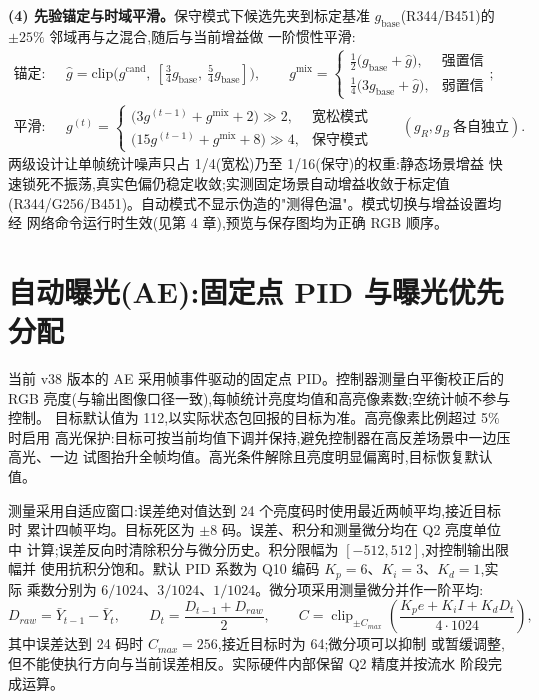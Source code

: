 \textbf{(4) 先验锚定与时域平滑。}保守模式下候选先夹到标定基准
$g_{\mathrm{base}}$(R344/B451)的 $\pm25\%$ 邻域再与之混合,随后与当前增益做
一阶惯性平滑:
\begin{align*}
\text{锚定:}\quad & \hat g=\mathrm{clip}\bigl(g^{\mathrm{cand}},\
[\tfrac34 g_{\mathrm{base}},\ \tfrac54 g_{\mathrm{base}}]\bigr),\qquad
g^{\mathrm{mix}}=\begin{cases}\tfrac12\bigl(g_{\mathrm{base}}+\hat g\bigr), & \text{强置信}\\[2pt]
\tfrac14\bigl(3g_{\mathrm{base}}+\hat g\bigr), & \text{弱置信}\end{cases};\\[4pt]
\text{平滑:}\quad & g^{(t)}=\begin{cases}
\bigl(3g^{(t-1)}+g^{\mathrm{mix}}+2\bigr)\gg 2, & \text{宽松模式}\\[2pt]
\bigl(15g^{(t-1)}+g^{\mathrm{mix}}+8\bigr)\gg 4, & \text{保守模式}\end{cases}
\qquad(g_R,g_B\ \text{各自独立}) .
\end{align*}
两级设计让单帧统计噪声只占 1/4(宽松)乃至 1/16(保守)的权重:静态场景增益
快速锁死不振荡,真实色偏仍稳定收敛;实测固定场景自动增益收敛于标定值
(R344/G256/B451)。自动模式不显示伪造的"测得色温"。模式切换与增益设置均经
网络命令运行时生效(见第 4 章),预览与保存图均为正确 RGB 顺序。

\section{自动曝光(AE):固定点 PID 与曝光优先分配}

当前 v38 版本的 AE 采用帧事件驱动的固定点 PID。控制器测量白平衡校正后的 RGB
亮度(与输出图像口径一致),每帧统计亮度均值和高亮像素数;空统计帧不参与控制。
目标默认值为 112,以实际状态包回报的目标为准。高亮像素比例超过 5\% 时启用
高光保护:目标可按当前均值下调并保持,避免控制器在高反差场景中一边压高光、一边
试图抬升全帧均值。高光条件解除且亮度明显偏离时,目标恢复默认值。

测量采用自适应窗口:误差绝对值达到 24 个亮度码时使用最近两帧平均,接近目标时
累计四帧平均。目标死区为 $\pm8$ 码。误差、积分和测量微分均在 Q2 亮度单位中
计算;误差反向时清除积分与微分历史。积分限幅为 $[-512,512]$,对控制输出限幅并
使用抗积分饱和。默认 PID 系数为 Q10 编码 $K_p=6$、$K_i=3$、$K_d=1$,实际
乘数分别为 $6/1024$、$3/1024$、$1/1024$。微分项采用测量微分并作一阶平均:
\begin{equation*}
D_{raw}=\bar Y_{t-1}-\bar Y_t,\qquad
D_t=\frac{D_{t-1}+D_{raw}}{2},\qquad
C=\operatorname{clip}_{\pm C_{max}}\left(\frac{K_pe+K_iI+K_dD_t}{4\cdot1024}\right),
\end{equation*}
其中误差达到 24 码时 $C_{max}=256$,接近目标时为 64;微分项可以抑制
或暂缓调整,但不能使执行方向与当前误差相反。实际硬件内部保留 Q2 精度并按流水
阶段完成运算。

